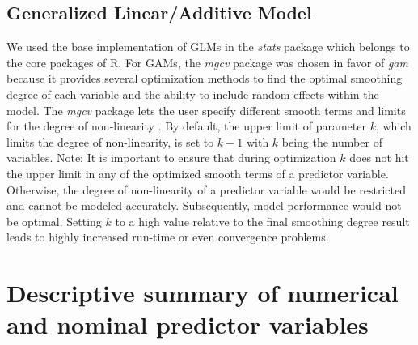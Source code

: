 \documentclass[review]{elsarticle}
\begin{document}
\subsection{Generalized Linear/Additive Model}
We used the base implementation of \ac{GLM}s in the \textit{stats} package which belongs to the core packages of R.
For \ac{GAM}s, the \textit{mgcv} package was chosen in favor of \textit{gam} because it provides several optimization methods to find the optimal smoothing degree of each variable and the ability to include random effects within the model.
The \textit{mgcv} package lets the user specify different smooth terms and limits for the degree of non-linearity \citep{mgcv}.
By default, the upper limit of parameter $k$, which limits the degree of non-linearity, is set to $k-1$ with $k$ being the number of variables.
Note: It is important to ensure that during optimization $k$ does not hit the upper limit in any of the optimized smooth terms of a predictor variable.
Otherwise, the degree of non-linearity of a predictor variable would be restricted and cannot be modeled accurately.
Subsequently, model performance would not be optimal.
Setting $k$ to a high value relative to the final smoothing degree result leads to highly increased run-time or even convergence problems.


\section{Descriptive summary of numerical and nominal predictor variables}
\end{document}
